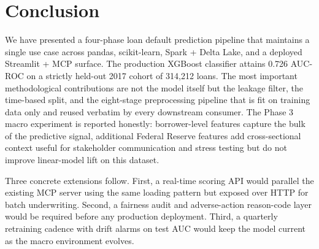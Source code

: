 \documentclass[conference]{IEEEtran}
\begin{document}
\section{Conclusion}

We have presented a four-phase loan default prediction pipeline that
maintains a single use case across pandas, scikit-learn, Spark + Delta Lake,
and a deployed Streamlit + MCP surface. The production XGBoost classifier
attains 0.726 AUC-ROC on a strictly held-out 2017 cohort of 314{,}212
loans. The most important methodological contributions are not the model
itself but the leakage filter, the time-based split, and the eight-stage
preprocessing pipeline that is fit on training data only and reused
verbatim by every downstream consumer. The Phase 3 macro experiment is
reported honestly: borrower-level features capture the bulk of the
predictive signal, additional Federal Reserve features add cross-sectional
context useful for stakeholder communication and stress testing but do not
improve linear-model lift on this dataset.

Three concrete extensions follow. First, a real-time scoring API would
parallel the existing MCP server using the same loading pattern but exposed
over HTTP for batch underwriting. Second, a fairness audit and adverse-action
reason-code layer would be required before any production deployment.
Third, a quarterly retraining cadence with drift alarms on test AUC would
keep the model current as the macro environment evolves.



\end{document}
